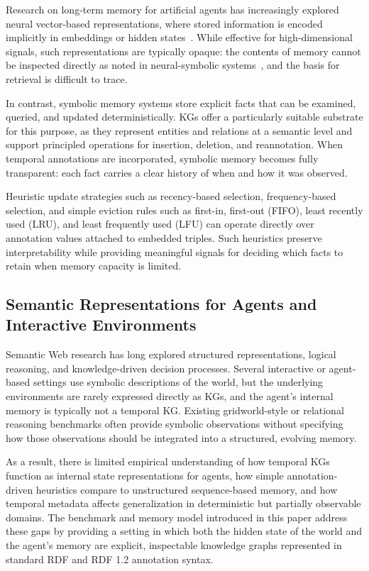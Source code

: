 \documentclass[Afour,sageh,times]{sagej}
\begin{document}
Research on long-term memory for artificial agents has increasingly explored neural
vector-based representations, where stored information is encoded implicitly in
embeddings or hidden
states~\citep{graves2014neural,graves2016hybrid,Wayne2018MERLIN,DBLP:journals/corr/abs-1803-10122,pritzel2017neuralepisodiccontrol,blundell2016modelfreeepisodiccontrol}.
While effective for high-dimensional signals, such representations are typically opaque:
the contents of memory cannot be inspected directly as noted in neural-symbolic
systems~\citep{besold2017neuralsymboliclearningreasoningsurvey}, and the basis for
retrieval is difficult to trace.

In contrast, symbolic memory systems store explicit facts that can be examined, queried,
and updated deterministically. KGs offer a particularly suitable substrate for this
purpose, as they represent entities and relations at a semantic level and support
principled operations for insertion, deletion, and reannotation. When temporal
annotations are incorporated, symbolic memory becomes fully transparent: each fact
carries a clear history of when and how it was observed.

Heuristic update strategies such as recency-based selection, frequency-based selection,
and simple eviction rules such as first-in, first-out (FIFO), least recently used
(LRU), and least frequently used (LFU) can operate directly over annotation values
attached to embedded triples. Such heuristics preserve interpretability while providing
meaningful signals for deciding which facts to retain when memory capacity is limited.

\subsection{Semantic Representations for Agents and Interactive Environments}

Semantic Web research has long explored structured representations, logical reasoning,
and knowledge-driven decision processes. Several interactive or agent-based settings use
symbolic descriptions of the world, but the underlying environments are rarely expressed
directly as KGs, and the agent’s internal memory is typically not a temporal KG.
Existing gridworld-style or relational reasoning benchmarks often provide symbolic
observations without specifying how those observations should be integrated into a
structured, evolving memory.

As a result, there is limited empirical understanding of how temporal KGs function as
internal state representations for agents, how simple annotation-driven heuristics
compare to unstructured sequence-based memory, and how temporal metadata affects
generalization in deterministic but partially observable domains. The benchmark and
memory model introduced in this paper address these gaps by providing a setting in which
both the hidden state of the world and the agent’s memory are explicit, inspectable
knowledge graphs represented in standard RDF and RDF 1.2 annotation syntax.
\end{document}

